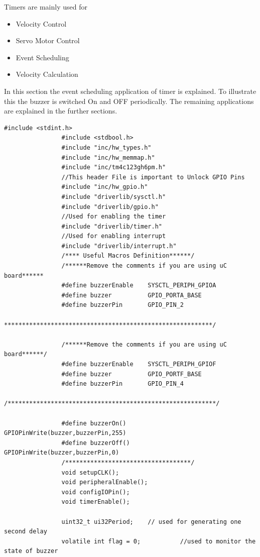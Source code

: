 \documentclass[a4paper,10pt,oneside]{article}
\begin{document}
			Timers are mainly used for
			\begin{itemize}
				\item Velocity Control
				\item Servo Motor Control
				\item Event Scheduling
				\item Velocity Calculation
			\end{itemize}
			
			In this section the event scheduling application of timer is explained. To illustrate this the buzzer is switched On and OFF periodically. The remaining applications are explained in the further sections. \\
			
			\begin{lstlisting}[style=CStyle]
				#include <stdint.h>
				#include <stdbool.h>
				#include "inc/hw_types.h"
				#include "inc/hw_memmap.h"
				#include "inc/tm4c123gh6pm.h"
				//This header File is important to Unlock GPIO Pins
				#include "inc/hw_gpio.h"
				#include "driverlib/sysctl.h"
				#include "driverlib/gpio.h"
				//Used for enabling the timer
				#include "driverlib/timer.h"
				//Used for enabling interrupt
				#include "driverlib/interrupt.h"
				/**** Useful Macros Definition******/
				/******Remove the comments if you are using uC board******
				#define buzzerEnable    SYSCTL_PERIPH_GPIOA
				#define buzzer          GPIO_PORTA_BASE
				#define buzzerPin       GPIO_PIN_2
				**********************************************************/
				
				/******Remove the comments if you are using uC board******/
				#define buzzerEnable    SYSCTL_PERIPH_GPIOF
				#define buzzer          GPIO_PORTF_BASE
				#define buzzerPin       GPIO_PIN_4
				/**********************************************************/
				
				#define buzzerOn()      GPIOPinWrite(buzzer,buzzerPin,255)
				#define buzzerOff()     GPIOPinWrite(buzzer,buzzerPin,0)
				/***********************************/
				void setupCLK();
				void peripheralEnable();
				void configIOPin();
				void timerEnable();
				
				uint32_t ui32Period;    // used for generating one second delay
				volatile int flag = 0;           //used to monitor the state of buzzer
				

\end{lstlisting}
\end{document}
